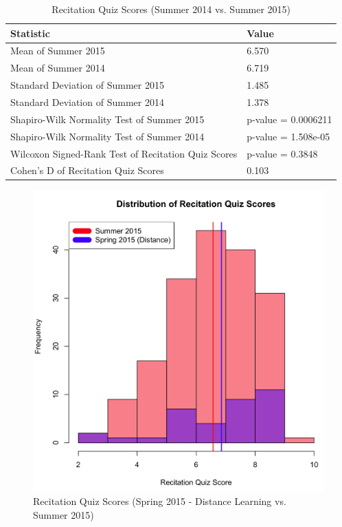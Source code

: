 \pagebreak\clearpage

\begin{small}
\begin{table}
  \centering
  \begin{tabular}{|l|l|}
    \hline
    \textbf{Statistic} & \textbf{Value} \\
	\hline
	Mean of Summer 2015 & 6.570 \\
	\hline
	Mean of Summer 2014 & 6.719 \\
	\hline
	Standard Deviation of Summer 2015 & 1.485 \\
	\hline
	Standard Deviation of Summer 2014 & 1.378 \\
	\hline
	Shapiro-Wilk Normality Test of Summer 2015 & p-value = 0.0006211 \\
	\hline
	Shapiro-Wilk Normality Test of Summer 2014 & p-value = 1.508e-05 \\
	\hline
	Wilcoxon Signed-Rank Test of Recitation Quiz Scores & p-value = 0.3848 \\
	\hline
	Cohen's D of Recitation Quiz Scores & 0.103 \\
	\hline
  \end{tabular}
	\caption{Recitation Quiz Scores (Summer 2014 vs. Summer 2015)}
  \label{tab:rqSu14Su15}
\end{table}
\end{small}

\pagebreak\clearpage

\begin{figure}
	\centering
	\includegraphics[width=5in]{img/chapter4/rq_su15_vs_sp15d}
	\caption{Recitation Quiz Scores (Spring 2015 - Distance Learning vs. Summer 2015)}
  \label{fig:rqSp15dSu15}
\end{figure}

